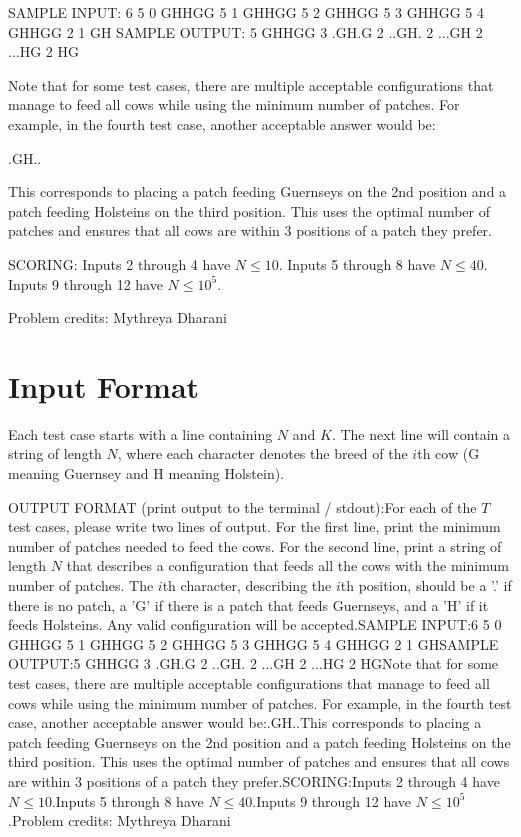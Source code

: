 \documentclass[12pt]{article}
\begin{document}
SAMPLE INPUT:
6
5 0
GHHGG
5 1
GHHGG
5 2
GHHGG
5 3
GHHGG
5 4
GHHGG
2 1
GH
SAMPLE OUTPUT: 
5
GHHGG
3
.GH.G
2
..GH.
2
...GH
2
...HG
2
HG

Note that for some test cases, there are multiple acceptable configurations that
manage to feed all cows while using the minimum number of patches. For example,
in the fourth test case, another acceptable answer would be:


.GH..

This corresponds to placing a patch feeding Guernseys on the 2nd position and a
patch feeding Holsteins on the third position. This uses the optimal number of
patches and ensures that all cows are within 3 positions of a patch they prefer.



SCORING:
Inputs 2 through 4 have $N \le 10$. Inputs 5 through 8 have $N \le 40$. Inputs 9 through 12 have $N \le 10^5$. 


Problem credits: Mythreya Dharani



\section*{Input Format}
Each test case starts with a line containing $N$ and $K$. The next line will
contain a string of length $N$, where each character denotes the breed of the
$i$th cow (G meaning Guernsey and H meaning Holstein).

OUTPUT FORMAT (print output to the terminal / stdout):For each of the $T$ test cases, please write two lines of output. For the first
line, print the minimum number of patches needed to feed the cows. For the
second line, print a string of length $N$ that describes a configuration  that
feeds all the cows with the minimum number of patches. The $i$th character,
describing the $i$th position, should be a '.' if there is no patch, a 'G' if
there is a patch that feeds Guernseys, and a 'H' if it feeds Holsteins. Any
valid configuration will be accepted.SAMPLE INPUT:6
5 0
GHHGG
5 1
GHHGG
5 2
GHHGG
5 3
GHHGG
5 4
GHHGG
2 1
GHSAMPLE OUTPUT:5
GHHGG
3
.GH.G
2
..GH.
2
...GH
2
...HG
2
HGNote that for some test cases, there are multiple acceptable configurations that
manage to feed all cows while using the minimum number of patches. For example,
in the fourth test case, another acceptable answer would be:.GH..This corresponds to placing a patch feeding Guernseys on the 2nd position and a
patch feeding Holsteins on the third position. This uses the optimal number of
patches and ensures that all cows are within 3 positions of a patch they prefer.SCORING:Inputs 2 through 4 have $N \le 10$.Inputs 5 through 8 have $N \le 40$.Inputs 9 through 12 have $N \le 10^5$.Problem credits: Mythreya Dharani
\end{document}
